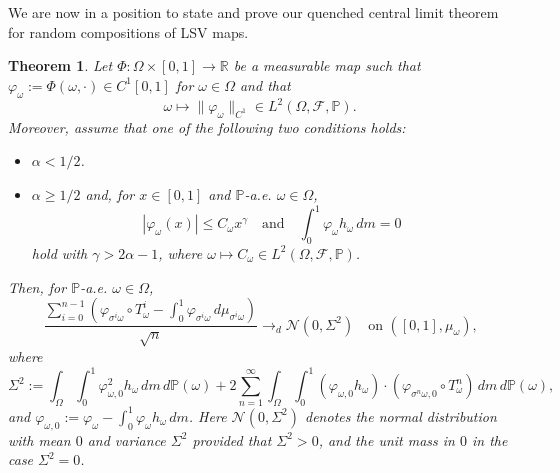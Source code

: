 \documentclass[12pt,reqno,a4paper]{article}
\newcommand\bP{{\mathbb P}}
\newtheorem{theorem}{Theorem}
\begin{document}
	We are now in a position to state and prove our quenched central limit theorem for random compositions of LSV maps.
	\begin{theorem}\label{qclt}
		Let $\Phi \colon \Omega \times [0, 1] \to \mathbb R$ be a measurable map such that $\varphi_\omega:=\Phi (\omega, \cdot)\in C^1[0, 1]$ for $\omega \in \Omega$ and that 
		\begin{equation}\label{integ}
			\omega \mapsto \|\varphi_\omega\|_{C^1} \in L^2(\Omega, \mathcal F, \mathbb P).
		\end{equation}
		Moreover, assume that one of the following two conditions holds:
		\begin{itemize}
			\item[(i)] $\alpha < 1/2$.
			\item[(ii)] $\alpha \ge 1/2$ and,
			for $x \in [0,1]$ and $\bP$-a.e. $\omega \in \Omega$, 
			\begin{equation}\label{special_observable}
				|\varphi_\omega(x)| \le C_\omega x^{\gamma} \quad 
				\text{and} \quad \int_0^1 \varphi_\omega h_\omega \, dm = 0
			\end{equation}
			hold with $\gamma > 2 \alpha - 1$, where $\omega \mapsto C_\omega \in L^2(\Omega, \mathcal{F}, \bP)$.
		\end{itemize}
		Then, for $\mathbb P$-a.e. $\omega \in \Omega$,
		\[
		\frac{\sum_{i=0}^{n-1}(\varphi_{\sigma^i \omega}\circ T_\omega^i-\int_0^1\varphi_{\sigma^i \omega}\, d\mu_{\sigma^i \omega})}{\sqrt n}\to_d \mathcal N(0, \Sigma^2) \quad \text{on $([0, 1], \mu_\omega)$,}
		\]
		where 
		\[
		\Sigma^2:=\int_\Omega \int_0^1 \varphi_{\omega, 0}^2h_\omega \, dm\, d\mathbb P(\omega)+2\sum_{n=1}^\infty\int_\Omega \int_0^1 (\varphi_{\omega, 0}h_\omega) \cdot (\varphi_{\sigma^n \omega, 0}\circ T_\omega^n)\, dm\, d\mathbb P(\omega),
		\]
		and $\varphi_{\omega, 0}:=\varphi_\omega-\int_0^1 \varphi_\omega h_\omega \, dm$. Here $\mathcal N(0, \Sigma^2)$ denotes the normal distribution with mean $0$ and variance $\Sigma^2$ provided that $\Sigma^2>0$, and the unit mass in $0$ in the case $\Sigma^2=0$.
	\end{theorem}
	
\end{document}
